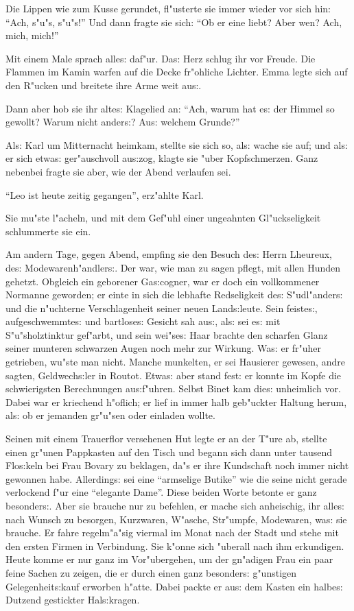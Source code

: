 \documentclass[oneside,12pt]{book}
\newcommand{\s}{s:}%
\begin{document}
Die Lippen wie zum Kusse gerundet, fl"usterte sie immer wieder vor
sich hin: "`Ach, s"u"s, s"u"s!"' Und dann fragte sie sich: "`Ob er
eine liebt? Aber wen? Ach, mich, mich!"'

Mit einem Male sprach alle{\s} daf"ur. Da{\s} Herz schlug ihr vor
Freude. Die Flammen im Kamin warfen auf die Decke fr"ohliche
Lichter. Emma legte sich auf den R"ucken und breitete ihre Arme
weit au{\s}.

Dann aber hob sie ihr alte{\s} Klagelied an: "`Ach, warum hat
e{\s} der Himmel so gewollt? Warum nicht ander{\s}? Au{\s} welchem
Grunde?"'

Al{\s} Karl um Mitternacht heimkam, stellte sie sich so, al{\s}
wache sie auf; und al{\s} er sich etwa{\s} ger"auschvoll
au{\s}zog, klagte sie "uber Kopfschmerzen. Ganz nebenbei fragte
sie aber, wie der Abend verlaufen sei.

"`Leo ist heute zeitig gegangen"', erz"ahlte Karl.

Sie mu"ste l"acheln, und mit dem Gef"uhl einer ungeahnten
Gl"uckseligkeit schlummerte sie ein.

Am andern Tage, gegen Abend, empfing sie den Besuch de{\s} Herrn
Lheureux, de{\s} Modewarenh"andler{\s}. Der war, wie man zu sagen
pflegt, mit allen Hunden gehetzt. Obgleich ein geborener
Ga{\s}cogner, war er doch ein vollkommener Normanne geworden; er
einte in sich die lebhafte Redseligkeit de{\s} S"udl"ander{\s} und
die n"uchterne Verschlagenheit seiner neuen Land{\s}leute. Sein
feiste{\s}, aufgeschwemmte{\s} und bartlose{\s} Gesicht sah
au{\s}, al{\s} sei e{\s} mit S"u"sholztinktur gef"arbt, und sein
wei"se{\s} Haar brachte den scharfen Glanz seiner munteren
schwarzen Augen noch mehr zur Wirkung. Wa{\s} er fr"uher
getrieben, wu"ste man nicht. Manche munkelten, er sei Hausierer
gewesen, andre sagten, Geldwech{\s}ler in Routot. Etwa{\s} aber
stand fest: er konnte im Kopfe die schwierigsten Berechnungen
au{\s}f"uhren. Selbst Binet kam die{\s} unheimlich vor. Dabei war
er kriechend h"oflich; er lief in immer halb geb"uckter Haltung
herum, al{\s} ob er jemanden gr"u"sen oder einladen wollte.

Seinen mit einem Trauerflor versehenen Hut legte er an der T"ure
ab, stellte einen gr"unen Pappkasten auf den Tisch und begann sich
dann unter tausend Flo{\s}keln bei Frau Bovary zu beklagen, da"s
er ihre Kundschaft noch immer nicht gewonnen habe. Allerding{\s}
sei eine "`armselige Butike"' wie die seine nicht gerade
verlockend f"ur eine "`elegante Dame"'. Diese beiden Worte betonte
er ganz besonder{\s}. Aber sie brauche nur zu befehlen, er mache
sich anheischig, ihr alle{\s} nach Wunsch zu besorgen, Kurzwaren,
W"asche, Str"umpfe, Modewaren, wa{\s} sie brauche. Er fahre
regelm"a"sig viermal im Monat nach der Stadt und stehe mit den
ersten Firmen in Verbindung. Sie k"onne sich "uberall nach ihm
erkundigen. Heute komme er nur ganz im Vor"ubergehen, um der
gn"adigen Frau ein paar feine Sachen zu zeigen, die er durch einen
ganz besonder{\s} g"unstigen Gelegenheit{\s}kauf erworben h"atte.
Dabei packte er au{\s} dem Kasten ein halbe{\s} Dutzend gestickter
Hal{\s}kragen.
\end{document}

